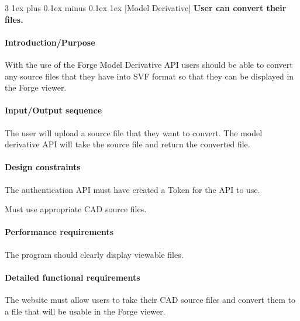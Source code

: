 \documentclass[letterpaper, 10pt, draftclsnofoot, compsoc, onecolumn]{IEEEtran}
\makeatletter
\def\subsubsection{\@startsection{subsubsection}%
                                 {3}%
                                 {\z@}%
                                 {1ex plus 0.1ex minus 0.1ex}%
                                 {1ex}%
                                 {\normalfont\normalsize}}%
\makeatother
\begin{document}

\subsubsection[{Model Derivative}]{\rmfamily\bfseries\color{black} \rmfamily\bfseries\color{black}  
	User can convert their files.
}


\paragraph[Introduction/Purpose of this
feature]{\rmfamily\bfseries\color{black}
Introduction/Purpose }
	With the use of the Forge Model Derivative API users should be able to convert any source files that they have into SVF format
	so that they can be displayed in the Forge viewer.

\paragraph[Input/Output sequence]{\rmfamily\bfseries\color{black}
Input/Output sequence }
	The user will upload a source file that they want to convert. The model derivative API will take the source file and return the 
	converted file.

\paragraph[Design constraints]{\rmfamily\bfseries\color{black} Design
constraints }
	The authentication API must have created a Token for the API to use.

	Must use appropriate CAD source files. 

\paragraph[Performance requirements]{\rmfamily\bfseries\color{black}
Performance requirements }
	The program should clearly display viewable files.

\paragraph[Detailed functional requirements]{\rmfamily\bfseries\color{black}
Detailed functional requirements }
	The website must allow users to take their CAD source files and convert them to a file that will be usable in the
	Forge viewer.    
\end{document}

